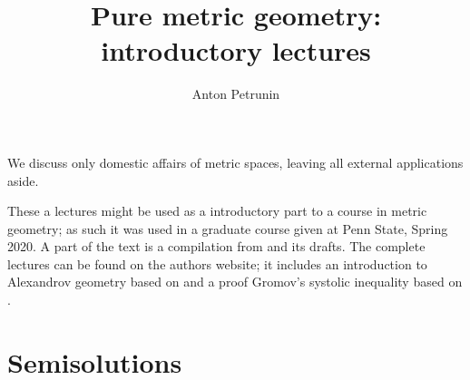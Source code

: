 \documentclass[twoside]{book}
\begin{document}
 
\title{Pure metric geometry:\\
introductory lectures}
\author{Anton Petrunin}
\date{}
\maketitle

We discuss only domestic affairs of metric spaces, leaving all  	external applications aside.

These a lectures might be used as a introductory part to a course in metric geometry;
as such it was used in a graduate course given at Penn State, Spring 2020.
A part of the text is a compilation from \cite{alexander-kapovitch-petrunin-2019, alexander-kapovitch-petrunin-2025, petrunin-yashinski, petrunin-2009, petrunin-zamorabarrera} and its drafts.
The complete lectures can be found on the authors website;
it includes an introduction to Alexandrov geometry based on \cite{alexander-kapovitch-petrunin-2019} and a proof Gromov's systolic inequality based on \cite{nabutovsky}.

\thispagestyle{empty}
\tableofcontents
\thispagestyle{empty}







\appendix
\chapter{Semisolutions}






{\small\sloppy


\printbibliography[heading=bibintoc]
\fussy
}
\end{document}
